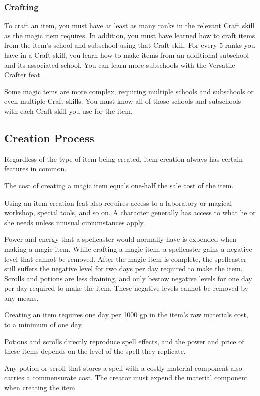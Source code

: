 \subsubsection{Crafting}
To craft an item, you must have at least as many ranks in the relevant Craft skill as the magic item requires. In addition, you must have learned how to craft items from the item's school and subschool using that Craft skill. For every 5 ranks you have in a Craft skill, you learn how to make items from an additional subschool and its associated school. You can learn more subschools with the Versatile Crafter feat.

Some magic tems are more complex, requiring multiple schools and subschools or even multiple Craft skills. You must know all of those schools and subschools with each Craft skill you use for the item.

\subsection{Creation Process}
Regardless of the type of item being created, item creation always has certain features in common.

 The cost of creating a magic item equals one-half the sale cost of the item.

Using an item creation feat also requires access to a laboratory or magical workshop, special tools, and so on. A character generally has access to what he or she needs unless unusual circumstances apply.

 Power and energy that a spellcaster would normally have is expended when making a magic item. While crafting a magic item, a spellcaster gains a negative level that cannot be removed. After the magic item is complete, the spellcaster still suffers the negative level for two days per day required to make the item. Scrolls and potions are less draining, and only bestow negative levels for one day per day required to make the item. These negative levels cannot be removed by any means.

 Creating an item requires one day per 1000 gp in the item's raw materials cost, to a minimum of one day.

 Potions and scrolls directly reproduce spell effects, and the power and price of these items depends on the level of the spell they replicate.

 Any potion or scroll that stores a spell with a costly material component also carries a commensurate cost. The creator must expend the material component when creating the item.

